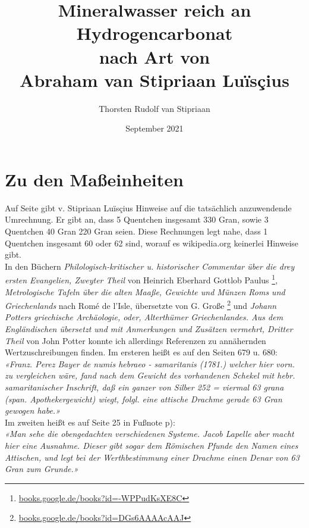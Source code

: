 \documentclass[a5paper,8pt]{scrbook}
\title{Mineralwasser reich an Hydrogencarbonat\\nach Art von\\Abraham van Stipriaan Luïsçius}
\author{Thorsten Rudolf van Stipriaan}
\date{September 2021}
\begin{document}
\section{Zu den Maßeinheiten}


Auf Seite \pageref{units_value_page} gibt
v. Stipriaan Luïsçius
Hinweise auf die tatsächlich anzuwendende Umrechnung.
Er gibt an,
dass 5  Quentchen insgesamt 330 Gran,
sowie 3 Quentchen 40 Gran 220 Gran seien.
Diese Rechnungen%
legt nahe, dass 1 Quentchen insgesamt 60 oder 62 sind,
worauf es wikipedia.org keinerlei Hinweise gibt.\\

In den Büchern
\emph{Philologisch-kritischer u. historischer Commentar
über die drey ersten Evangelien, Zweyter Theil}
von Heinrich Eberhard Gottlob Paulus%
\footnote{\href{https://books.google.de/books?id=-WPPudKsXE8C}
{books.google.de/books?id=-WPPudKsXE8C}},
\emph{Metrologische Tafeln über die alten Maaße,
Gewichte und Münzen Roms und Griechenlands}
nach Romé de l'Isle,
übersetzte von G. Große%
\footnote{\href{https://books.google.de/books?id=DGs6AAAAcAAJ}
{books.google.de/books?id=DGs6AAAAcAAJ}}
und
\emph{Johann Potters griechische Archäologie,
oder, Alterthümer Griechenlandes.
Aus dem Engländischen übersetzt
und mit Anmerkungen und Zusätzen vermehrt, Dritter Theil}
von John Potter
konnte ich allerdings Referenzen zu annähernden Wertzuschreibungen finden.
Im ersteren heißt es auf den Seiten 679 u. 680:\\

\emph{«Franz. Perez Bayer de numis hebraeo - samaritanis (1781.)
welcher hier vorn. zu vergleichen wäre,
fand nach dem Gewicht des vorhandenen Schekel
mit hebr. samaritanischer Inschrift,
daß ein ganzer von Silber
252 = viermal 63 grana (span. Apothekergewicht) wiegt,
folgl. eine attische Drachme gerade 63 Gran gewogen habe.»}\\

Im zweiten heißt es auf Seite 25 in Fußnote p):\\

\emph{«Man sehe die obengedachten verschiedenen Systeme.
Jacob Lapelle aber macht hier eine Ausnahme.
Dieser gibt sogar dem Römischen Pfunde den Namen eines Attischen,
und legt bei der Werthbestimmung einer Drachme
einen Denar von 63 Gran zum Grunde.»}\\
\end{document}
